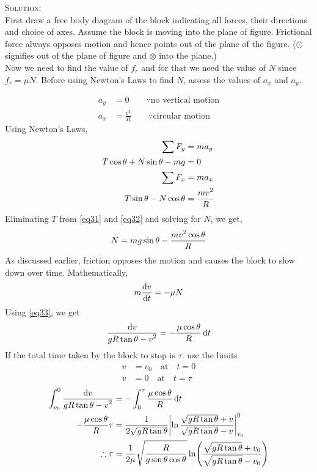 \textsc{Solution:}\\
First draw a free body diagram of the block indicating all forces, their directions and choice of axes. Assume the block is moving into the plane of figure. Frictional force always opposes motion and hence points out of the plane of the figure. ($\odot$ signifies out of the plane of figure and $\otimes$ into the plane.)\\
Now we need to find the value of $f_r$ and for that we need the value of $N$ since $f_r=\mu N$. Before using Newton's Laws to find $N$, assess the values of $a_x$ and $a_y$.
\begin{figure}[hbt]
    \centering
    
\end{figure}
\begin{align*}
a_y&=0 \qquad \because\text{no vertical motion}\\
a_x&=\frac{v^2}{R} \qquad \because\text{circular motion}
\end{align*}
Using Newton's Laws,
\begin{align}
 \sum F_y&=ma_y \nonumber\\
T\cos\theta + N\sin\theta - mg&=0 \label{eq31}\\
\sum F_x &= ma_x \nonumber\\
T\sin\theta - N\cos\theta &= \frac{\displaystyle mv^2}{\displaystyle R}\label{eq32}
\end{align}
Eliminating $T$ from \eqref{eq31} and \eqref{eq32} and solving for $N$, we get,
\begin{equation}
N=mg\sin\theta - \frac{\displaystyle mv^2\cos\theta}{\displaystyle R} \label{eq33}
\end{equation}
As discussed earlier, friction opposes the motion and causes the block to slow down over time. Mathematically,
\begin{equation*}
m\frac{\displaystyle \mathop{}\!\mathrm{d} v}{\displaystyle \mathop{}\!\mathrm{d} t}=-\mu N
\end{equation*}
Using \eqref{eq33}, we get
\begin{equation*}
\frac{\displaystyle \mathop{}\!\mathrm{d} v}{\displaystyle gR\tan\theta - v^2}=-\frac{\displaystyle \mu \cos \theta}{\displaystyle R}\mathop{}\!\mathrm{d} t
\end{equation*}
If the total time taken by the block to stop is $\tau$. use the limits
\begin{align*}
v&=v_0 \quad \text{at} \quad t=0\\
v&=0 \quad \text{at} \quad t=\tau
\end{align*}
\begin{align*}
\int_{v_0}^0 \frac{\displaystyle \mathop{}\!\mathrm{d} v}{\displaystyle gR\tan \theta - v^2}&=-\int_0^\tau \frac{\mu \cos \theta}{R} \mathop{}\!\mathrm{d} t\\
-\frac{\mu\cos\theta}{R}\tau&= \frac{1}{2\sqrt{gR\tan\theta}}\biggl|\ln \frac{\sqrt{gR\tan\theta}+v}{\sqrt{gR\tan\theta}-v}\biggr|_{v_0}^0\\
\therefore \tau&=\frac{\displaystyle 1}{\displaystyle 2\mu}\sqrt{\frac{\displaystyle R}{\displaystyle g\sin\theta\cos\theta}}\ln \Biggl( \frac{\displaystyle \sqrt{gR\tan\theta}+v_0}{\displaystyle \sqrt{gR\tan\theta}-v_0}\Biggr)
\end{align*}
